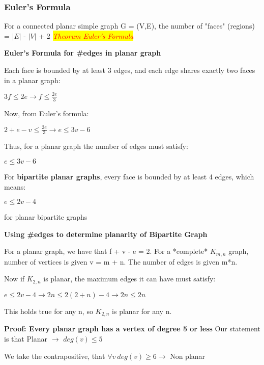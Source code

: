 \documentclass{article}
\newcommand{\theorum}[1]{\quad \quad \colorbox{yellow}{\textit{\textcolor{red}{Theorum #1}}}}
\newcommand{\sub}[1]{\vspace{10pt}\textbf{#1}}
\begin{document}
\subsubsection{Euler's Formula}
For a connected planar simple graph G = (V,E), the number of "faces" (regions) = $|E|$ - $|V|$ + 2 \theorum{Euler's Formula}

\sub{Euler's Formula for \#edges in planar graph}

Each face is bounded by at least 3 edges, and each edge shares exactly two faces in a planar graph:
\begin{center}
    $3f \leq 2e \rightarrow f \leq \frac{2e}{3}$
\end{center}

Now, from Euler's formula:
\begin{center}
    $2 + e - v \leq \frac{2e}{3} \rightarrow e \leq 3v - 6$
\end{center}

Thus, for a planar graph the number of edges must satisfy:
\begin{center}
    $e \leq 3v - 6$
\end{center}

For \textbf{bipartite planar graphs}, every face is bounded by at least 4 edges, which means:
\begin{center}
    $e \leq 2v-4$
\end{center}
for planar bipartite graphs

\sub{Using \#edges to determine planarity of Bipartite Graph}

For a planar graph, we have that f + v - e = 2. For a *complete* $K_{m,n}$ graph, number of vertices is given v = m + n. The number of edges is given m*n.

Now if $K_{2,n}$ is planar, the maximum edges it can have must satisfy:
\begin{center}
    $e \leq 2v - 4 \rightarrow 2n \leq 2(2+n) - 4 \rightarrow 2n \leq 2n$
\end{center}
This holds true for any n, so $K_{2,n}$ is planar for any n.

\sub{Proof: Every planar graph has a vertex of degree 5 or less}
Our statement is that Planar $\rightarrow$ $deg(v)\leq 5$

We take the contrapositive, that $\forall v\ deg(v) \geq 6 \rightarrow$ Non planar
\end{document}
